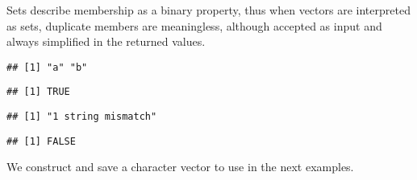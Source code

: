 \documentclass[krantz2]{krantz}\usepackage{knitr}
\begin{document}
\begin{warningbox}
Sets describe membership as a binary property, thus when vectors are interpreted as sets, duplicate members are meaningless, although accepted as input and always simplified in the returned values.

\begin{knitrout}\footnotesize
{}\color{fgcolor}\begin{kframe}
\begin{alltt}
\hlstd{(}\hlstd{(}\hlstd{,} \hlstd{,} \hlstd{),} \hlstd{(}\hlstd{,} \hlstd{,} \hlstd{))} 
\end{alltt}
\begin{verbatim}
## [1] "a" "b"
\end{verbatim}
\begin{alltt}
\hlstd{(}\hlstd{(}\hlstd{,} \hlstd{,} \hlstd{),} \hlstd{(}\hlstd{,} \hlstd{,} \hlstd{))} 
\end{alltt}
\begin{verbatim}
## [1] TRUE
\end{verbatim}
\begin{alltt}
\hlstd{(}\hlstd{(}\hlstd{,} \hlstd{,} \hlstd{),} \hlstd{(}\hlstd{,} \hlstd{,} \hlstd{))} 
\end{alltt}
\begin{verbatim}
## [1] "1 string mismatch"
\end{verbatim}
\begin{alltt}
\hlstd{(}\hlstd{(}\hlstd{,} \hlstd{,} \hlstd{),} \hlstd{(}\hlstd{,} \hlstd{,} \hlstd{))} 
\end{alltt}
\begin{verbatim}
## [1] FALSE
\end{verbatim}
\end{kframe}
\end{knitrout}
\end{warningbox}

We construct and save a character vector to use in the next examples.
\end{document}
